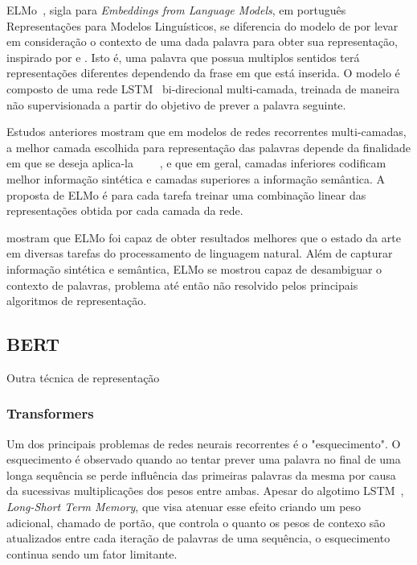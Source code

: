 ELMo~\cite{peters18}, sigla para \textit{Embeddings from Language Models}, em
português Representações para Modelos Linguísticos, se diferencia do modelo de
\citet{cho14} por levar em consideração o contexto de uma dada palavra para
obter sua representação, inspirado por \citet{peters17} e \citet{mccann17}.
Isto é, uma palavra que possua multiplos sentidos terá representações diferentes
dependendo da frase em que está inserida.
O modelo é composto de uma rede LSTM~\cite{hochreiter97} bi-direcional
multi-camada, treinada de maneira não supervisionada a partir do objetivo de
prever a palavra seguinte.

Estudos anteriores mostram que em modelos de redes recorrentes multi-camadas,
a melhor camada escolhida para representação das palavras depende da finalidade
em que se deseja aplica-la
~\cite{hashimoto16}~\cite{sogaard16}~\cite{belinkov17}~\cite{melamud16}, e que
em geral, camadas inferiores codificam melhor informação sintética e camadas
superiores a informação semântica.
A proposta de ELMo é para cada tarefa treinar uma combinação linear das
representações obtida por cada camada da rede.


\citet{peters18} mostram que ELMo foi capaz de obter resultados melhores que o
estado da arte em diversas tarefas do processamento de linguagem natural.
Além de capturar informação sintética e semântica, ELMo se mostrou capaz de
desambiguar o contexto de palavras, problema até então não resolvido pelos
principais algoritmos de representação.

\subsection{BERT}

Outra técnica de representação

\subsubsection{Transformers}

Um dos principais problemas de redes neurais recorrentes é o "esquecimento".
O esquecimento é observado quando ao tentar prever uma palavra no final de uma
longa sequência se perde influência das primeiras palavras da mesma por causa da
sucessivas multiplicações dos pesos entre ambas.
Apesar do algotimo LSTM~\cite{hochreiter97}, \textit{Long-Short Term Memory},
que visa atenuar esse efeito criando um peso adicional, chamado de portão, que
controla o quanto os pesos de contexo são atualizados entre cada iteração de
palavras de uma sequência, o esquecimento continua sendo um fator limitante.

